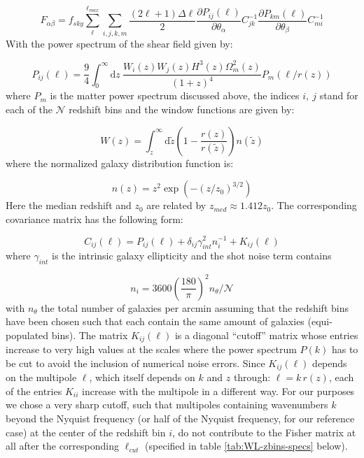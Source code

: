 \begin{equation}
F_{\alpha\beta}=f_{sky}\sum_{\ell}^{\ell_{max}}\sum_{i,j,k,m}\frac{(2\ell+1)\Delta\ell}{2}\frac{\partial P_{ij}(\ell)}{\partial\theta_{\alpha}}C_{jk}^{-1}\frac{\partial P_{km}(\ell)}{\partial\theta_{\beta}}C_{mi}^{-1}\label{eq:FisherSum-WL}
\end{equation}
With the power spectrum of the shear field given by:

\begin{equation}
P_{ij}(\ell)=\frac{9}{4}\int_{0}^{\infty}\mbox{d}z\:\frac{W_{i}(z)W_{j}(z)H^{3}(z)\Omega_{m}^{2}(z)}{(1+z)^{4}}P_{m}(\ell/r(z))
\end{equation}
where $P_{m}$ is the matter power spectrum discussed above, the indices
$i,\: j$ stand for each of the $\mathcal{N}$ redshift bins and the
window functions are given by:

\begin{equation}
W(z)=\int_{z}^{\infty}\mbox{d}\tilde{z}\left(1-\frac{r(z)}{r(\tilde{z})}\right)n(\tilde{z})
\end{equation}
where the normalized galaxy distribution function is:

\begin{equation}
n(z)=z^{2}\exp\left(-(z/z_{0})^{3/2}\right)\label{eq:ngal dist}
\end{equation}
Here the median redshift and $z_{0}$ are related by $z_{med}\approx1.412z_{0}$.
The corresponding covariance matrix has the following form:

\begin{equation}
C_{ij}(\ell)=P_{ij}(\ell)+\delta_{ij}\gamma_{int}^{2}n_{i}^{-1}+K_{ij}(\ell)
\end{equation}
where $\gamma_{int}$ is the intrinsic galaxy ellipticity and the
shot noise term contains

\begin{equation}
n_{i}=3600\left(\frac{180}{\pi}\right)^{2}n_{\theta}/\mathcal{N}
\end{equation}
with $n_{\theta}$ the total number of galaxies per arcmin\texttwosuperior{}
assuming that the redshift bins have been chosen such that each contain
the same amount of galaxies (equi-populated bins). The matrix $K_{ij}(\ell)$
is a diagonal ``cutoff'' matrix whose entries increase to very high
values at the scales where the power spectrum $P(k)$ has to be cut
to avoid the inclusion of numerical noise errors. Since $K_{ij}(\ell)$
depends on the multipole $\ell$, which itself depends on $k$ and
$z$ through: $\ell=k\, r(z)$, each of the entries $K_{ii}$ increase
with the multipole in a different way. For our purposes we chose a
very sharp cutoff, such that multipoles containing wavenumbers $k$
beyond the Nyquist frequency (or half of the Nyquist frequency, for
our reference case) at the center of the redshift bin $i$, do not
contribute to the Fisher matrix at all after the corresponding $\ell_{cut}$
(specified in table \ref{tab:WL-zbins-specs} below).



